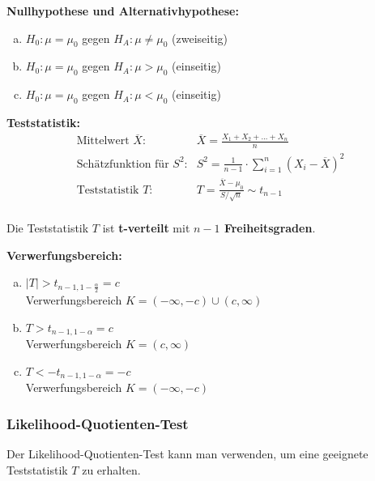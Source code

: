 \documentclass[10pt,a4paper,twocolumn]{article}
\begin{document}
\vspace{10pt}

\textbf{Nullhypothese und Alternativhypothese:}
\begin{enumerate}[a)]
\item $H_0: \mu=\mu_0$ gegen $H_A:\mu\neq \mu_0$ (zweiseitig)
\item $H_0: \mu=\mu_0$ gegen $H_A:\mu > \mu_0$ (einseitig)
\item $H_0: \mu=\mu_0$ gegen $H_A:\mu < \mu_0$ (einseitig)
\end{enumerate}

\vspace{10pt}

\textbf{Teststatistik:}
\[
\begin{array}{ll}
	\text{Mittelwert $\overline{X}$:} & \overline{X}=\frac{X_1+X_2+...+X_n}{n} \\
	\text{Schätzfunktion für $S^2$:} & S^2 = \frac{1}{n-1}\cdot \sum\limits_{i=1}^{n}(X_i - \overline{X})^2 \\
	\text{Teststatistik $T$:} & T = \frac{\overline{X}-\mu_0}{S/\sqrt{n}}\sim t_{n-1} \\
\end{array}
\]

Die Teststatistik $T$ ist \textbf{t-verteilt} mit \textbf{$n-1$ Freiheitsgraden}.

\vspace{10pt}

\textbf{Verwerfungsbereich:}
\begin{enumerate}[a)]
\item $|T|>t_{n-1,1-\frac{\alpha}{2}}=c$ \\
      Verwerfungsbereich $K=(-\infty,-c) \cup (c,\infty)$
\item $T>t_{n-1,1-\alpha}=c$ \\
      Verwerfungsbereich $K=(c,\infty)$
\item $T<-t_{n-1,1-\alpha}=-c$ \\
      Verwerfungsbereich $K=(-\infty,-c)$
\end{enumerate}





\subsubsection{Likelihood-Quotienten-Test}
Der Likelihood-Quotienten-Test kann man verwenden, um eine geeignete Teststatistik $T$ zu erhalten. 

\vspace{10pt}
\end{document}
